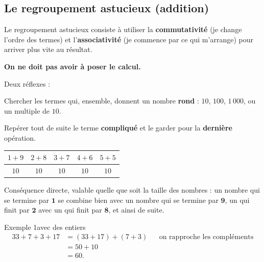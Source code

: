 \subsection{Le regroupement astucieux (addition)}

\begin{theorie}
Le regroupement astucieux consiste à utiliser la \textbf{commutativité} (je change
l'ordre des termes) et l'\textbf{associativité} (je commence par ce qui m'arrange)
pour arriver plus vite au résultat.

\textbf{On ne doit pas avoir à poser le calcul.}
\end{theorie}

\begin{astuce}
Deux réflexes :
\begin{compactenum}
\item Chercher les termes qui, ensemble, donnent un nombre \textbf{rond} : $10$, $100$,
      $1\,000$, ou un multiple de $10$.
\item Repérer tout de suite le terme \textbf{compliqué} et le garder pour la
      \textbf{dernière} opération.
\end{compactenum}
\end{astuce}

\begin{aretenir}[title={Les compléments à 10 : à connaître par cœur}]
\begin{center}
\renewcommand{\arraystretch}{1.3}
\begin{tabular}{|c|c|c|c|c|}
\hline
\rowcolor{entete}
$1 + 9$ & $2 + 8$ & $3 + 7$ & $4 + 6$ & $5 + 5$ \\
\hline
$10$ & $10$ & $10$ & $10$ & $10$ \\
\hline
\end{tabular}
\end{center}

Conséquence directe, valable quelle que soit la taille des nombres : un nombre qui
se termine par $\mathbf{1}$ se combine bien avec un nombre qui se termine par
$\mathbf{9}$, un qui finit par $\mathbf{2}$ avec un qui finit par $\mathbf{8}$, et ainsi
de suite.
\end{aretenir}

\begin{exemple}{Exemple 1}{avec des entiers}
\begin{align*}
  33 + 7 + 3 + 17 &= (33 + 17) + (7 + 3) &&\text{on rapproche les compléments} \\
                  &= 50 + 10 \\
                  &= 60.
\end{align*}
\end{exemple}

